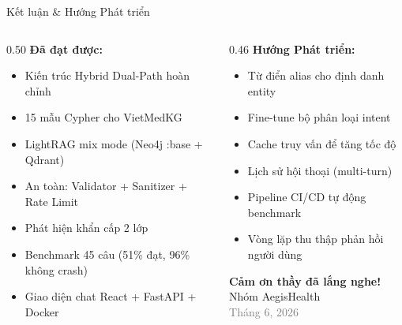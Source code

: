 \documentclass[aspectratio=169, 11pt]{beamer}
\begin{document}
\begin{frame}{Kết luận \& Hướng Phát triển}
  \begin{columns}[t]
    \begin{column}{0.50\textwidth}
      \textbf{Đã đạt được:}
      \begin{itemize}
        \scriptsize
        \item[\textcolor{successGreen}{\checkmark}] Kiến trúc Hybrid Dual-Path hoàn chỉnh
        \item[\textcolor{successGreen}{\checkmark}] 15 mẫu Cypher cho VietMedKG
        \item[\textcolor{successGreen}{\checkmark}] LightRAG mix mode (Neo4j :base + Qdrant)
        \item[\textcolor{successGreen}{\checkmark}] An toàn: Validator + Sanitizer + Rate Limit
        \item[\textcolor{successGreen}{\checkmark}] Phát hiện khẩn cấp 2 lớp
        \item[\textcolor{successGreen}{\checkmark}] Benchmark 45 câu (51\% đạt, 96\% không crash)
        \item[\textcolor{successGreen}{\checkmark}] Giao diện chat React + FastAPI + Docker
      \end{itemize}
    \end{column}
    \begin{column}{0.46\textwidth}
      \textbf{Hướng Phát triển:}
      \begin{itemize}
        \scriptsize
        \item Từ điển alias cho định danh entity
        \item Fine-tune bộ phân loại intent
        \item Cache truy vấn để tăng tốc độ
        \item Lịch sử hội thoại (multi-turn)
        \item Pipeline CI/CD tự động benchmark
        \item Vòng lặp thu thập phản hồi người dùng
      \end{itemize}
      \vspace{0.8em}
      \begin{center}
        \Large\textbf{Cảm ơn thầy đã lắng nghe!}\\[0.5em]
        \normalsize Nhóm AegisHealth\\
        \scriptsize\textcolor{grayText}{Tháng 6, 2026}
      \end{center}
    \end{column}
  \end{columns}
\end{frame}
\end{document}
